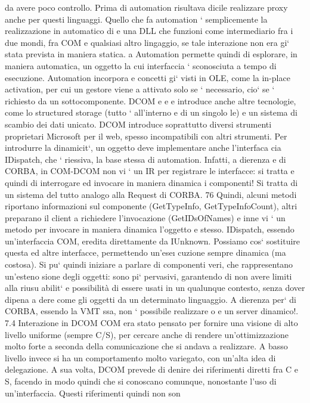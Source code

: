 \documentclass[a4paper,12pt]{article}
\begin{document}
da avere poco controllo. Prima di automation risultava dicile realizzare proxy
anche per questi linguaggi.
Quello che fa automation ` semplicemente la realizzazione in automatico di
e
una DLL che funzioni come intermediario fra i due mondi, fra COM e qualsiasi
altro lingaggio, se tale interazione non era gi` stata prevista in maniera statica.
a
Automation permette quindi di esplorare, in maniera automatica, un oggetto
la cui interfaccia ` sconosciuta a tempo di esecuzione. Automation incorpora
e
concetti gi` visti in OLE, come la in-place activation, per cui un gestore viene
a
attivato solo se ` necessario, cio` se ` richiesto da un sottocomponente. DCOM
e
e e
introduce anche altre tecnologie, come lo structured storage (tutto ` all'interno
e
di un singolo le) e un sistema di scambio dei dati unicato. DCOM introduce
soprattutto diversi strumenti proprietari Microsoft per il web, spesso incompatibili con altri strumenti.
Per introdurre la dinamicit`, un oggetto deve implementare anche l'interfaca
cia IDispatch, che ` riessiva, la base stessa di automation. Infatti, a dierenza
e
di CORBA, in COM-DCOM non vi ` un IR per registrare le interfacce: si tratta
e
quindi di interrogare ed invocare in maniera dinamica i componenti! Si tratta
di un sistema del tutto analogo alla Request di CORBA.
76
Quindi, alcuni metodi riportano informazioni sul componente (GetTypeInfo,
GetTypeInfoCount), altri preparano il client a richiedere l'invocazione (GetIDsOfNames) e inne vi ` un metodo per
invocare in maniera dinamica l'oggetto
e
stesso. IDispatch, essendo un'interfaccia COM, eredita direttamente da IUnknown. Possiamo cos` sostituire questa ed
altre interfacce, permettendo un'ese\i{}
cuzione sempre dinamica (ma costosa).
Si pu` quindi iniziare a parlare di componenti veri, che rappresentano un'esteno
sione degli oggetti: sono pi` pervasivi, garantendo di non avere limiti alla riusu
abilit` e possibilità di essere usati in un qualunque contesto, senza dover dipena
a
dere come gli oggetti da un determinato linguaggio.
A dierenza per` di CORBA, essendo la VMT ssa, non ` possibile realizzare
o
e
un server dinamico!.
7.4
Interazione in DCOM
COM era stato pensato per fornire una visione di alto livello uniforme (sempre
C/S), per cercare anche di rendere un'ottimizzazione molto forte a seconda
della comunicazione che si andava a realizzare. A basso livello invece si ha un
comportamento molto variegato, con un'alta idea di delegazione.
A sua volta, DCOM prevede di denire dei riferimenti diretti fra C e S,
facendo in modo quindi che si conoscano comunque, nonostante l'uso di un'interfaccia. Questi riferimenti quindi non son
\end{document}
